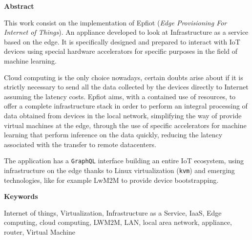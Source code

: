 
\newpage

\thispagestyle{empty}

\begin{center}

{\bf \Huge Abstract}

  \end{center}
\vspace{1cm}

This work consist on the implementation of {\sc Epfiot} ({\em Edge Provisioning For Internet of Things}). An appliance developed to look at Infrastructure as a service based on the edge. It is specifically designed and prepared to interact with IoT devices using special hardware accelerators for specific purposes in the field of machine learning.

Cloud computing is the only choice nowadays, certain doubts arise about if it is strictly necessary to send all the data collected by the devices directly to Internet assuming the latency costs. Epfiot aims, with a contained use of resources, to offer a complete infrastructure stack in order to perform an integral processing of data obtained from devices in the local network, simplifying the way of provide virtual machines at the edge, through the use of specific accelerators for machine learning that perform inference on the data quickly, reducing the latency associated with the transfer to remote datacenters.

The application has a \texttt{GraphQL} interface building an entire IoT ecosystem, using infrastructure on the edge thanks to Linux virtualization ({\tt kvm}) and emerging technologies, like for example LwM2M to provide device bootstrapping.

\vspace{1cm}


\begin{center}

{\bf \Large Keywords}

   \end{center}

   \vspace{0.5cm}
   
Internet of things, Virtualization, Infrastructure as a Service, IaaS, Edge computing, cloud computing, LWM2M, LAN, local area network, appliance, router, Virtual Machine
   


